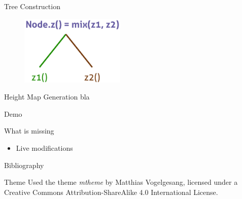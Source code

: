\documentclass{beamer}
\begin{document}
\begin{frame}{Tree Construction}
  
  \begin{figure}
    \begin{center}
      \includegraphics[width=5cm]{mix}
    \end{center}
  \end{figure}
  
\end{frame}

\begin{frame}{Height Map Generation}
  bla
\end{frame}

\begin{frame}{Demo}
\end{frame}

\begin{frame}{What is missing}
  \begin{itemize}
    \item Live modifications
  \end{itemize}
\end{frame}

\bgroup
{}
\begin{frame}[plain]{}
\end{frame}
\egroup


\begin{frame}{Bibliography}
  
\end{frame}

\begin{frame}{Theme}
  Used the theme \emph{mtheme} by Matthias Vogelgesang, licensed under a Creative Commons
  Attribution-ShareAlike 4.0 International License.
\end{frame}
\end{document}
